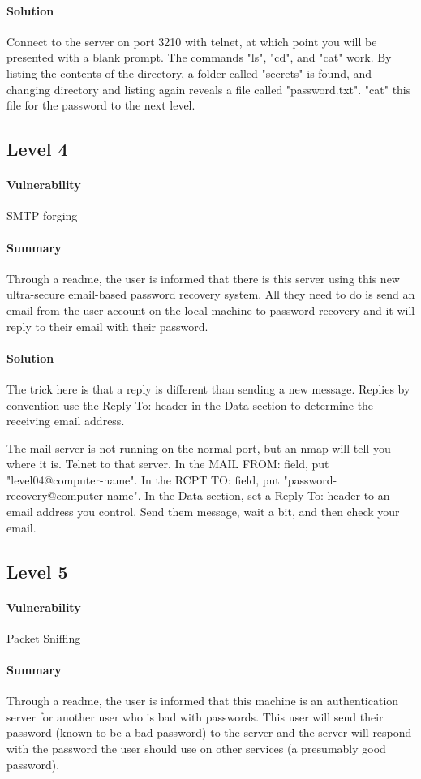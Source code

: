 \documentclass[12pt]{article}
\begin{document}
\paragraph{Solution} Connect to the server on port 3210 with telnet, at which point you will be presented with a blank prompt. The commands "ls", "cd", and "cat" work. By listing the contents of the directory, a folder called "secrets" is found, and changing directory and listing again reveals a file called "password.txt". "cat" this file for the password to the next level.

\subsection{Level 4}
\paragraph{Vulnerability} SMTP forging
\paragraph{Summary} Through a readme, the user is informed that there is this
server using this new ultra-secure email-based password recovery system. All they need to do
is send an email from the user account on the local machine to
password-recovery and it will reply to their email with their password.
\paragraph{Solution} The trick here is that a reply is different than sending a
new message. Replies by convention use the Reply-To: header in the Data section
to determine the receiving email address. 

The mail server is not running on the normal port, but an
nmap will tell you where it is.  Telnet to that server. In the MAIL FROM: field,
put "level04@computer-name". In the RCPT TO: field, put
"password-recovery@computer-name". In the Data section, set a Reply-To:
header to an email address you control. Send them message, wait a bit, and then
check your email. 
\subsection{Level 5}
\paragraph{Vulnerability} Packet Sniffing
\paragraph{Summary}  Through a readme, the user is informed that this machine
is an authentication server for another user who is bad with passwords.  This user
will send their password (known to be a bad password) to the server and the server
will respond with the password the user should use on other services (a presumably good
password).
\end{document}
